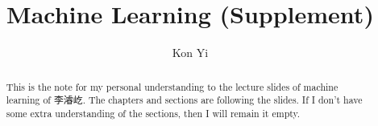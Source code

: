 \documentclass[a4paper]{report}
\author{Kon Yi}
\title{Machine Learning (Supplement)}
\begin{document}
\maketitle

\begin{abstract}
	This is the note for my personal understanding to the lecture slides of machine learning of 李濬屹. The chapters and sections are following the slides. If I don't have some extra understanding of the sections, then I will remain it empty.
\end{abstract}

\newpage

\tableofcontents


\newpage
\appendix
\appendixpage{}



\newpage
\pagestyle{plain}
\printbibliography{}
\end{document}
